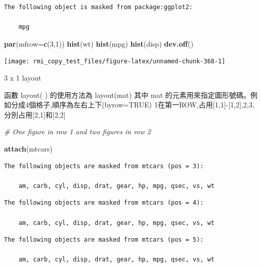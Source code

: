 \documentclass[]{book}
\newenvironment{Shaded}{\begin{snugshade}}{\end{snugshade}}
\newcommand{\KeywordTok}[1]{\textcolor[rgb]{0.13,0.29,0.53}{\textbf{#1}}}
\newcommand{\DataTypeTok}[1]{\textcolor[rgb]{0.13,0.29,0.53}{#1}}
\newcommand{\DecValTok}[1]{\textcolor[rgb]{0.00,0.00,0.81}{#1}}
\newcommand{\CommentTok}[1]{\textcolor[rgb]{0.56,0.35,0.01}{\textit{#1}}}
\newcommand{\NormalTok}[1]{#1}
\theoremstyle{definition}
\theoremstyle{definition}
\theoremstyle{definition}
\theoremstyle{remark}
\begin{document}
\begin{verbatim}
The following object is masked from package:ggplot2:

    mpg
\end{verbatim}

\begin{Shaded}
\begin{Highlighting}[]
\KeywordTok{par}\NormalTok{(}\DataTypeTok{mfrow=}\KeywordTok{c}\NormalTok{(}\DecValTok{3}\NormalTok{,}\DecValTok{1}\NormalTok{)) }
\KeywordTok{hist}\NormalTok{(wt)}
\KeywordTok{hist}\NormalTok{(mpg)}
\KeywordTok{hist}\NormalTok{(disp)}
\KeywordTok{dev.off}\NormalTok{()}
\end{Highlighting}
\end{Shaded}

\begin{center}\texttt{[image: rmi\_copy\_test\_files/figure-latex/unnamed-chunk-368-1]} \end{center}

3 x 1 layout

函數 layout( ) 的使用方法為 layout(mat) 其中 mat
的元素用來指定圖形號碼。例如分成4個格子,順序為左右上下(byrow=TRUE)
1在第一ROW,占用{[}1,1{]}-{[}1,2{]},2,3,分別占用{[}2,1{]}和{[}2,2{]}

\begin{Shaded}
\begin{Highlighting}[]
\CommentTok{# One figure in row 1 and two figures in row 2}
 
\KeywordTok{attach}\NormalTok{(mtcars)}
\end{Highlighting}
\end{Shaded}

\begin{verbatim}
The following objects are masked from mtcars (pos = 3):

    am, carb, cyl, disp, drat, gear, hp, mpg, qsec, vs, wt
\end{verbatim}

\begin{verbatim}
The following objects are masked from mtcars (pos = 4):

    am, carb, cyl, disp, drat, gear, hp, mpg, qsec, vs, wt
\end{verbatim}

\begin{verbatim}
The following objects are masked from mtcars (pos = 5):

    am, carb, cyl, disp, drat, gear, hp, mpg, qsec, vs, wt
\end{verbatim}
\end{document}
